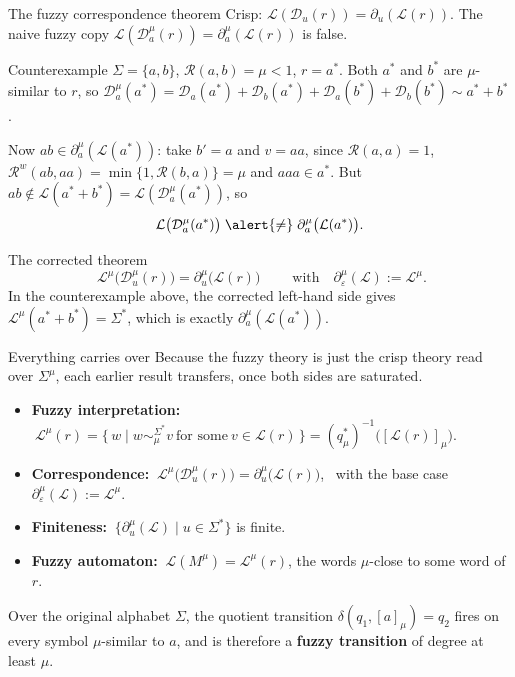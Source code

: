 \documentclass[aspectratio=169]{beamer}
\newcommand{\cR}{\mathcal{R}}
\newcommand{\cut}{\mu}
\newcommand{\Dd}{\mathcal{D}}                 %
\newcommand{\eps}{\varepsilon}
\newcommand{\st}{^{*}}                         %
\begin{document}
\begin{frame}{The fuzzy correspondence theorem}
  Crisp: $\mathcal L(\Dd_u(r))=\partial_u(\mathcal L(r))$. The naive fuzzy copy
  $\mathcal L(\Dd_a^\cut(r))=\partial_a^\cut(\mathcal L(r))$ is \alert{false}.
  \begin{block}{Counterexample}
    $\Sigma=\{a,b\}$, $\cR(a,b)=\cut<1$, $r=a\st$. Both $a\st$ and $b\st$ are
    $\cut$-similar to $r$, so
    $\Dd_a^\cut(a\st)=\Dd_a(a\st)+\Dd_b(a\st)+\Dd_a(b\st)+\Dd_b(b\st)\sim a\st{+}b\st$.

    Now $ab\in\partial_a^\cut(\mathcal L(a\st))$: take $b'=a$ and $v=aa$, since
    $\cR(a,a)=1$, $\cR^w(ab,aa)=\min\{1,\cR(b,a)\}=\cut$ and $aaa\in a\st$.
    But $ab\notin\mathcal L(a\st{+}b\st)=\mathcal L(\Dd_a^\cut(a\st))$, so
    \[
      \mathcal L\bigl(\Dd_a^\cut(a\st)\bigr)\;\alert{\neq}\;\partial_a^\cut\bigl(\mathcal L(a\st)\bigr).
    \]
  \end{block}
  \vfill
  \begin{block}{The corrected theorem}
    \[
      \boxed{\;\mathcal L^\cut\bigl(\Dd_u^\cut(r)\bigr)=\partial_u^\cut\bigl(\mathcal L(r)\bigr)\;}
      \qquad\text{with}\quad \partial_\eps^\cut(\mathcal L):=\mathcal L^\cut .
    \]
    In the counterexample above, the corrected left-hand side gives
    $\mathcal L^\cut(a\st{+}b\st)=\Sigma^*$, which is exactly
    $\partial_a^\cut(\mathcal L(a\st))$.
  \end{block}
\end{frame}

\begin{frame}{Everything carries over}
  Because the fuzzy theory is just the crisp theory read over $\Sigma^\cut$,
  each earlier result transfers, once both sides are saturated.
  \begin{itemize}
    \item \textbf{Fuzzy interpretation:}
      $\ \mathcal L^\cut(r)=\{\,w\mid w\sim_\cut^{\Sigma^*}v\ \text{for some}\ v\in \mathcal L(r)\,\}
       =(q_\cut^*)^{-1}\bigl([\mathcal L(r)]_\cut\bigr)$.
    \item \textbf{Correspondence:}
      $\ \mathcal L^\cut\bigl(\Dd_u^\cut(r)\bigr)=\partial_u^\cut\bigl(\mathcal L(r)\bigr)$,
      \ with the base case $\partial_\eps^\cut(\mathcal L):=\mathcal L^\cut$.
    \item \textbf{Finiteness:} $\ \{\partial_u^\cut(\mathcal L)\mid u\in\Sigma^*\}$ is finite.
    \item \textbf{Fuzzy automaton:} $\ \mathcal L(M^\cut)=\mathcal L^\cut(r)$,
      the words $\cut$-close to some word of $r$.
  \end{itemize}
  \vfill
  Over the original alphabet $\Sigma$, the quotient transition $\delta(q_1,[a]_\cut)=q_2$
  fires on every symbol $\cut$-similar to $a$, and is therefore a
  \textbf{fuzzy transition} of degree at least $\cut$.
\end{frame}
\end{document}
